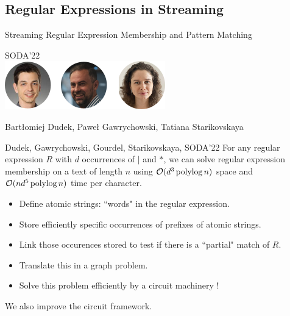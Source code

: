 \subsection{Regular Expressions in Streaming}
\begin{frame}
  \centering
  {\Large Streaming Regular Expression Membership and Pattern Matching}

  \bigskip
  {\large SODA'22}\\
  \bigskip
  \includegraphics{pictures/mindmap/regexp.png}

  \bigskip
  Bartłomiej Dudek, Paweł Gawrychowski, Tatiana Starikovskaya
\end{frame}


\begin{frame}{}

    \begin{myalertblock}{Dudek, Gawrychowski, Gourdel, Starikovskaya, SODA'22}
        For any regular expression $R$ with $d$ occurrences of $|$ and $\ast$, we can solve regular expression membership on a text of length $n$ using $\mathcal{O}(d^{3}\operatorname{polylog} n)$ space and $\mathcal{O}(nd^{5}\operatorname{polylog} n)$ time per character.
    \end{myalertblock}
    
    \pause
    \medskip
    \pause
    \begin{itemize}
    \item Define atomic strings: ``words" in the regular expression.
    \pause
    \item Store efficiently specific occurrences of prefixes of atomic strings.
    \pause
    \item Link those occurences stored to test if there is a ``partial" match of $R$.
    \pause
    \item Translate this in a graph problem.
    \pause
    \item Solve this problem efficiently by a circuit machinery !
    \end{itemize}\pause 
    We also improve the circuit framework.
\end{frame}


